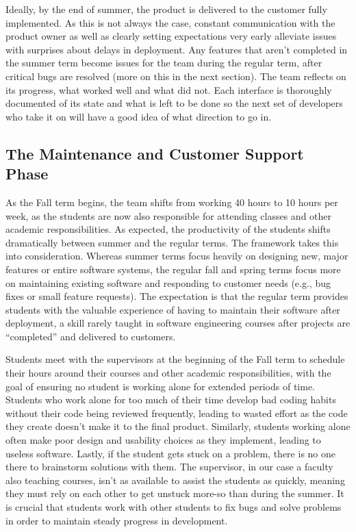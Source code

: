 Ideally, by the end of summer, the product is delivered to the customer fully implemented. As this is not always the case, constant communication with the product owner as well as clearly setting expectations very early alleviate issues with surprises about delays in deployment. Any features that aren't completed in the summer term become issues for the team during the regular term, after critical bugs are resolved (more on this in the next section). The team reflects on its progress, what worked well and what did not. Each interface is thoroughly documented of its state and what is left to be done so the next set of developers who take it on will have a good idea of what direction to go in.

\subsection{The Maintenance and Customer Support Phase}
As the Fall term begins, the team shifts from working 40 hours to 10 hours per week, as the students are now also responsible for attending classes and other academic responsibilities. As expected, the productivity of the students shifts dramatically between summer and the regular terms. The framework takes this into consideration. Whereas summer terms focus heavily on designing new, major features or entire software systems, the regular fall and spring terms focus more on maintaining existing software and responding to customer needs (e.g., bug fixes or small feature requests). The expectation is that the regular term provides students with the valuable experience of having to maintain their software after deployment, a skill rarely taught in software engineering courses after projects are ``completed'' and delivered to customers.

Students meet with the supervisors at the beginning of the Fall term to schedule their hours around their courses and other academic responsibilities, with the goal of ensuring no student is working alone for extended periods of time. Students who work alone for too much of their time develop bad coding habits without their code being reviewed frequently, leading to wasted effort as the code they create doesn't make it to the final product. Similarly, students working alone often make poor design and usability choices as they implement, leading to useless software. Lastly, if the student gets stuck on a problem, there is no one there to brainstorm solutions with them. The supervisor, in our case a faculty also teaching courses, isn't as available to assist the students as quickly, meaning they must rely on each other to get unstuck more-so than during the summer. It is crucial that students work with other students to fix bugs and solve problems in order to maintain steady progress in development.

